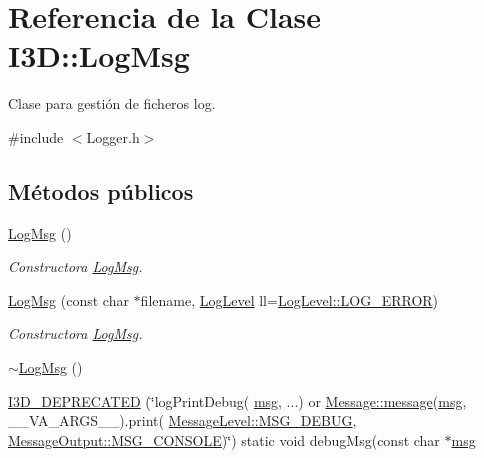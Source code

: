 \hypertarget{class_i3_d_1_1_log_msg}{}\section{Referencia de la Clase I3D\+:\+:Log\+Msg}
\label{class_i3_d_1_1_log_msg}


Clase para gestión de ficheros log.  




{\ttfamily \#include $<$Logger.\+h$>$}

\subsection*{Métodos públicos}
\begin{DoxyCompactItemize}
\item 
\hyperlink{class_i3_d_1_1_log_msg_a5cb7a7b1765778874c2b87d2245463c6}{Log\+Msg} ()
\begin{DoxyCompactList}\small\item\em Constructora \hyperlink{class_i3_d_1_1_log_msg}{Log\+Msg}. \end{DoxyCompactList}\item 
\hyperlink{class_i3_d_1_1_log_msg_ac6d1edcbbc1806f42114374f23cacb8d}{Log\+Msg} (const char $\ast$filename, \hyperlink{namespace_i3_d_ae1af0f2e3b629610c45222809ff521f6}{Log\+Level} ll=\hyperlink{namespace_i3_d_ae1af0f2e3b629610c45222809ff521f6a4490aa3d29644e716440fada68f54032}{Log\+Level\+::\+L\+O\+G\+\_\+\+E\+R\+R\+OR})
\begin{DoxyCompactList}\small\item\em Constructora \hyperlink{class_i3_d_1_1_log_msg}{Log\+Msg}. \end{DoxyCompactList}\item 
\hyperlink{class_i3_d_1_1_log_msg_aa0811c5bd5866194a285bd8d066a4f4c}{$\sim$\+Log\+Msg} ()
\item 
\hyperlink{class_i3_d_1_1_log_msg_ab0af596a2b1485e5d84d6bb948e7e34b}{I3\+D\+\_\+\+D\+E\+P\+R\+E\+C\+A\+T\+ED} (\char`\"{}log\+Print\+Debug( \hyperlink{class_i3_d_1_1_log_msg_a5a1ceb27d9529de8eb9b3fc9377e178a}{msg}, ...) or \hyperlink{class_i3_d_1_1_message_a525f877a41a1e7493188b2b720d1d254}{Message\+::message}(\hyperlink{class_i3_d_1_1_log_msg_a5a1ceb27d9529de8eb9b3fc9377e178a}{msg}, \+\_\+\+\_\+\+V\+A\+\_\+\+A\+R\+G\+S\+\_\+\+\_\+).print( \hyperlink{namespace_i3_d_a1c1740d2076e09b1a37b82e45a0327b5a918e87a1f80863c7ee35bfa2c58cc41e}{Message\+Level\+::\+M\+S\+G\+\_\+\+D\+E\+B\+UG}, \hyperlink{namespace_i3_d_a2ccb65ac6e08844c1175a235107fa103ace1cd665ada8b4f22dfa5f764fed6c6c}{Message\+Output\+::\+M\+S\+G\+\_\+\+C\+O\+N\+S\+O\+LE})\char`\"{}) static void debug\+Msg(const char $\ast$\hyperlink{class_i3_d_1_1_log_msg_a5a1ceb27d9529de8eb9b3fc9377e178a}{msg}

\end{DoxyCompactItemize}
